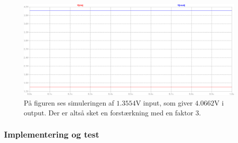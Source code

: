 \begin{figure}[H]
	\centering
	\includegraphics[scale=0.4]{figures/cProblemloesning/Forstaerker_faktor3_simulering.PNG}
	\caption{På figuren ses simuleringen af $1.3554$V input, som giver $4.0662$V i output. Der er altså sket en forstærkning med en faktor $3$.}
	\label{fig:faktor3_simulering}
\end{figure}

\subsubsection{Implementering og test}
